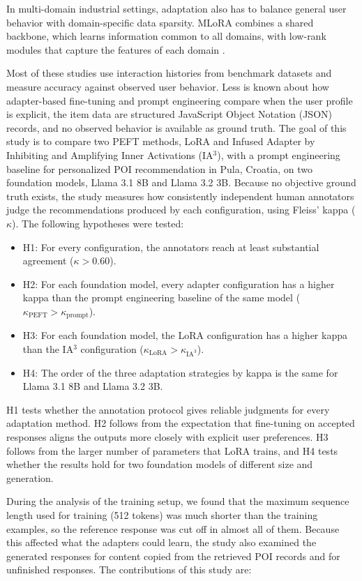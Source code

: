 \documentclass[journal,article,submit,pdftex,moreauthors]{Definitions/mdpi}
\begin{document}
In multi-domain industrial settings, adaptation also has to balance general user behavior with domain-specific data sparsity. MLoRA combines a shared backbone, which learns information common to all domains, with low-rank modules that capture the features of each domain \citep{yang2024mlora}.

Most of these studies use interaction histories from benchmark datasets and measure accuracy against observed user behavior. Less is known about how adapter-based fine-tuning and prompt engineering compare when the user profile is explicit, the item data are structured JavaScript Object Notation (JSON) records, and no observed behavior is available as ground truth. The goal of this study is to compare two PEFT methods, LoRA and Infused Adapter by Inhibiting and Amplifying Inner Activations (IA$^3$), with a prompt engineering baseline for personalized POI recommendation in Pula, Croatia, on two foundation models, Llama 3.1 8B and Llama 3.2 3B. Because no objective ground truth exists, the study measures how consistently independent human annotators judge the recommendations produced by each configuration, using Fleiss' kappa ($\kappa$). The following hypotheses were tested:

\begin{itemize}
\item H1: For every configuration, the annotators reach at least substantial agreement ($\kappa > 0.60$).
\item H2: For each foundation model, every adapter configuration has a higher kappa than the prompt engineering baseline of the same model ($\kappa_{\mathrm{PEFT}} > \kappa_{\mathrm{prompt}}$).
\item H3: For each foundation model, the LoRA configuration has a higher kappa than the IA$^3$ configuration ($\kappa_{\mathrm{LoRA}} > \kappa_{\mathrm{IA^3}}$).
\item H4: The order of the three adaptation strategies by kappa is the same for Llama 3.1 8B and Llama 3.2 3B.
\end{itemize}

H1 tests whether the annotation protocol gives reliable judgments for every adaptation method. H2 follows from the expectation that fine-tuning on accepted responses aligns the outputs more closely with explicit user preferences. H3 follows from the larger number of parameters that LoRA trains, and H4 tests whether the results hold for two foundation models of different size and generation.

During the analysis of the training setup, we found that the maximum sequence length used for training (512 tokens) was much shorter than the training examples, so the reference response was cut off in almost all of them. Because this affected what the adapters could learn, the study also examined the generated responses for content copied from the retrieved POI records and for unfinished responses. The contributions of this study are:
\end{document}

